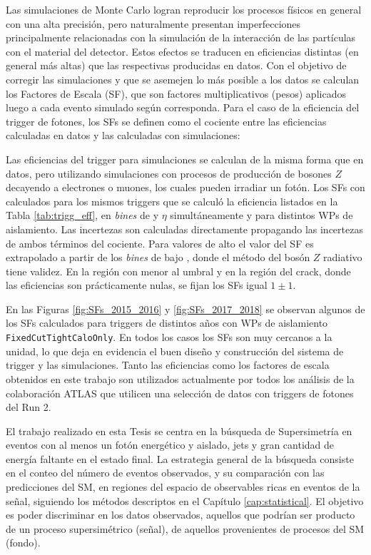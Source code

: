 Las simulaciones de Monte Carlo logran reproducir los procesos físicos en general con una alta precisión, pero naturalmente presentan imperfecciones principalmente relacionadas con la simulación de la interacción de las partículas con el material del detector. Estos efectos se traducen en eficiencias distintas (en general más altas) que las respectivas producidas en datos. Con el objetivo de corregir las simulaciones y que se asemejen lo más posible a los datos se calculan los Factores de Escala (SF), que son factores multiplicativos (pesos) aplicados luego a cada evento simulado según corresponda. Para el caso de la eficiencia del trigger de fotones, los SFs se definen como el cociente entre las eficiencias calculadas en datos y las calculadas con simulaciones:


Las eficiencias del trigger para simulaciones se calculan de la misma forma que en datos, pero utilizando simulaciones con procesos de producción de bosones $Z$ decayendo a electrones o muones, los cuales pueden irradiar un fotón. Los SFs con calculados para los mismos triggers que se calculó la eficiencia listados en la Tabla \ref{tab:trigg_eff}, en \textit{bines} de \ET y $\eta$ simultáneamente y para distintos WPs de aislamiento. Las incertezas son calculadas directamente propagando las incertezas de ambos términos del cociente. Para valores de alto \ET el valor del SF es extrapolado a partir de los \textit{bines} de bajo \ET, donde el método del bosón $Z$ radiativo tiene validez. En la región con \ET menor al umbral y en la región del crack, donde las eficiencias son prácticamente nulas, se fijan los SFs igual $1\pm1$. 
 
En las Figuras \ref{fig:SFs_2015_2016} y \ref{fig:SFs_2017_2018} se observan algunos de los SFs calculados para triggers de distintos años con WPs de aislamiento \texttt{FixedCutTightCaloOnly}. 
En todos los casos los SFs son muy cercanos a la unidad, lo que deja en evidencia el buen diseño y construcción del sistema de trigger y las simulaciones. Tanto las eficiencias como los factores de escala obtenidos en este trabajo son utilizados actualmente por todos los análisis de la colaboración ATLAS que utilicen una selección de datos con triggers de fotones del Run 2.






El trabajo realizado en esta Tesis se centra en la búsqueda de Supersimetría en eventos con al menos un fotón energético y aislado, jets y gran cantidad de energía faltante en el estado final. La estrategia general de la búsqueda consiste en el conteo del número de eventos observados, y su comparación con las predicciones del SM, en regiones del espacio de observables ricas en eventos de la señal, siguiendo los métodos descriptos en el Capítulo \ref{cap:statistical}. El objetivo es poder discriminar en los datos observados, aquellos que podrían ser producto de un proceso supersimétrico (señal), de aquellos provenientes de procesos del SM (fondo).



